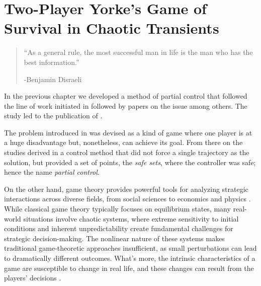 \chapter{Two-Player Yorke's Game of Survival in Chaotic Transients} %
\label{chap:PartialControlGame}


\begin{quotation}


\begin{flushright}
    \begin{minipage}[t][5cm][b]{0.5\textwidth}
    { ``As a general rule, the most successful man in life is the man who has the best information.''}
    
    \bigskip
    
    -{\small  Benjamin Disraeli}
    \end{minipage}
    \end{flushright}



    \vspace{0.5cm}

\end{quotation}




In the previous chapter we developed a method of partial control that followed the line of work initiated in \cite{Yorke} followed by papers on the issue \cite{DynamicsPartialControl,PartialControlBeyond,PartialControlFunctions} among others. The study led to the publication of \cite{PartialControlEscape}. 

The problem introduced in \cite{Yorke} was devised as a kind of game where one player is at a huge disadvantage but, nonetheless, can achieve its goal. From there on the studies derived in a control method that did not force a single trajectory as the solution, but provided a set of points, the \textit{safe sets}, where the controller was safe; hence the name \textit{partial control}.

On the other hand, game theory provides powerful tools for analyzing strategic interactions across diverse fields, from social sciences to economics and physics \cite{Social,EconomyGames,GamesComplex}. While classical game theory typically focuses on equilibrium states, many real-world situations involve chaotic systems, where extreme sensitivity to initial conditions and inherent unpredictability create fundamental challenges for strategic decision-making. The nonlinear nature of these systems makes traditional game-theoretic approaches insufficient, as small perturbations can lead to dramatically different outcomes. What's more, the intrinsic characteristics of a game are susceptible to change in real life, and these changes can result from the players' decisions \cite{AkiyamaKaneko1,AkiyamaKaneko2}.

